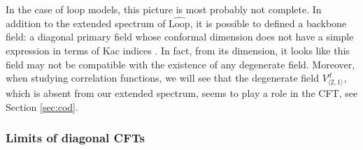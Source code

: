 \documentclass[12pt, a4paper]{article}
\theoremstyle{break}
\begin{document}
In the case of loop models, this picture is most probably not complete. In addition to the extended spectrum of $\widehat{\text{Loop}}$, it is possible to defined a backbone field: a diagonal primary field whose conformal dimension does not have a simple expression in terms of Kac indices \cite{nqsz23}. In fact, from its dimension, it looks like this field may not be compatible with the existence of any degenerate field. Moreover, when studying correlation functions, we will see that the degenerate field $V^d_{\langle 2,1\rangle}$, which is absent from our extended spectrum, seems to play a role in the CFT, see Section \ref{sec:cod}. 

\subsubsection{Limits of diagonal CFTs}\label{sec:lod}
\end{document}
